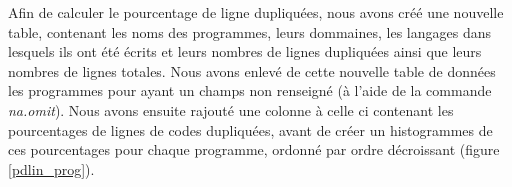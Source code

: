 Afin de calculer le pourcentage de ligne dupliquées, nous avons créé
une nouvelle table, contenant les noms des programmes, leurs
dommaines, les langages dans lesquels ils ont été écrits et leurs
nombres de lignes dupliquées ainsi que leurs nombres de lignes
totales. Nous avons enlevé de cette nouvelle table de données les
programmes pour ayant un champs non renseigné (à l'aide de la commande
\emph{na.omit}). Nous avons ensuite rajouté une colonne à celle ci
contenant les pourcentages de lignes de codes dupliquées, avant
de créer un histogrammes de ces pourcentages pour chaque programme,
ordonné par ordre décroissant (figure \ref{pdlin_prog}).
